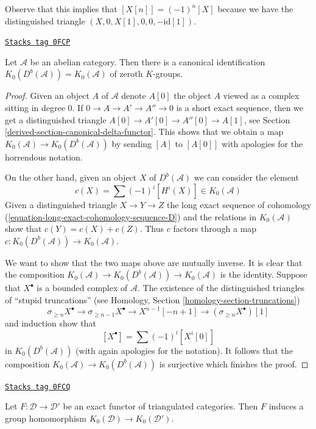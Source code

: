 Observe that this implies that $[X[n]] = (-1)^n[X]$ because we have
the distinguished triangle $(X, 0, X[1], 0, 0, -\text{id}[1])$.

\begin{lemma}
\label{derived-lemma-K-bounded-derived}
\href{https://stacks.math.columbia.edu/tag/0FCP}{\texttt{Stacks tag 0FCP}}

Let $\mathcal{A}$ be an abelian category. Then there is a canonical
identification $K_0(D^b(\mathcal{A})) = K_0(\mathcal{A})$
of zeroth $K$-groups.
\end{lemma}

\begin{proof}
Given an object $A$ of $\mathcal{A}$ denote $A[0]$ the object $A$
viewed as a complex sitting in degree $0$.
If $0 \to A \to A' \to A'' \to 0$ is a short
exact sequence, then we get a distinguished triangle
$A[0] \to A'[0] \to A''[0] \to A[1]$, see
Section \ref{derived-section-canonical-delta-functor}.
This shows that we obtain a map $K_0(\mathcal{A}) \to K_0(D^b(\mathcal{A}))$
by sending $[A]$ to $[A[0]]$ with apologies for the horrendous notation.

\medskip\noindent
On the other hand, given an object $X$ of $D^b(\mathcal{A})$ we can
consider the element
$$
c(X) = \sum (-1)^i[H^i(X)] \in K_0(\mathcal{A})
$$
Given a distinguished triangle $X \to Y \to Z$ the long exact sequence
of cohomology (\ref{equation-long-exact-cohomology-sequence-D})
and the relations in $K_0(\mathcal{A})$ show that
$c(Y) = c(X) + c(Z)$. Thus $c$ factors through a map
$c : K_0(D^b(\mathcal{A})) \to K_0(\mathcal{A})$.

\medskip\noindent
We want to show that the two maps above are mutually inverse.
It is clear that the composition $K_0(\mathcal{A}) \to
K_0(D^b(\mathcal{A})) \to K_0(\mathcal{A})$ is the identity.
Suppose that $X^\bullet$ is a bounded complex of $\mathcal{A}$.
The existence of the distinguished triangles of ``stupid truncations'' (see
Homology, Section \ref{homology-section-truncations})
$$
\sigma_{\geq n}X^\bullet \to \sigma_{\geq n - 1}X^\bullet \to
X^{n - 1}[-n + 1] \to (\sigma_{\geq n}X^\bullet)[1]
$$
and induction show that
$$
[X^\bullet] = \sum (-1)^i[X^i[0]]
$$
in $K_0(D^b(\mathcal{A}))$ (with again apologies for the notation).
It follows that the composition
$K_0(\mathcal{A}) \to K_0(D^b(\mathcal{A}))$ is surjective
which finishes the proof.
\end{proof}

\begin{lemma}[Map K]
\label{derived-lemma-map-K}
\href{https://stacks.math.columbia.edu/tag/0FCQ}{\texttt{Stacks tag 0FCQ}}

Let $F : \mathcal{D} \to \mathcal{D}'$ be an exact functor of triangulated
categories. Then $F$ induces a group homomorphism
$K_0(\mathcal{D}) \to K_0(\mathcal{D}')$.
\end{lemma}

